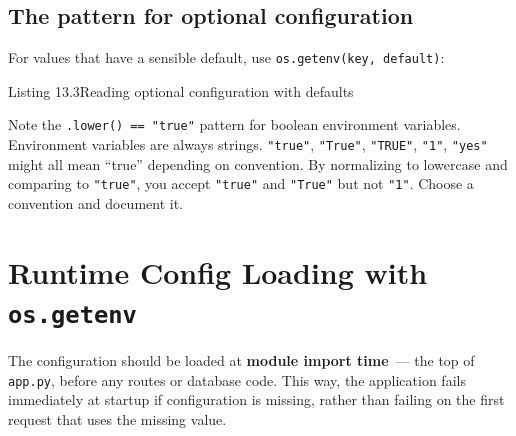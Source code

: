 \subsection*{The pattern for optional configuration}\label{13-configuration-externalization:the-pattern-for-optional-configuration}

For values that have a sensible default, use \texttt{os.getenv(key,}\allowbreak{}\texttt{\ default)}:

\begin{codeboxcap}[short]{\textcolor{accent}{Listing 13.3}\enspace Reading optional configuration with defaults}

\begin{Shaded}
\begin{Highlighting}[]
\OperatorTok{=}\NormalTok{, }\OperatorTok{==} 
\OperatorTok{=} \NormalTok{, }\NormalTok{))}
\OperatorTok{=}\NormalTok{, }\NormalTok{)}
\end{Highlighting}
\end{Shaded}

\end{codeboxcap}

\noindent{}Note the \texttt{.lower()\ =}\allowbreak{}\texttt{=}\allowbreak{}\texttt{\ "true"} pattern for boolean environment variables. Environment variables are always strings. \texttt{"true"}, \texttt{"True"}, \texttt{"TRUE"}, \texttt{"1"}, \texttt{"yes"} might all mean ``true'' depending on convention. By normalizing to lowercase and comparing to \texttt{"true"}, you accept \texttt{"true"} and \texttt{"True"} but not \texttt{"1"}. Choose a convention and document it.

\setcounter{section}{2}
\section{\texorpdfstring{Runtime Config Loading with \texttt{os.getenv}}{Runtime Config Loading with os.getenv}}\label{13-configuration-externalization:133-runtime-config-loading-with-osgetenv}

The configuration should be loaded at \textbf{module import time}~--- the top of \texttt{app.py}, before any routes or database code. This way, the application fails immediately at startup if configuration is missing, rather than failing on the first request that uses the missing value.

